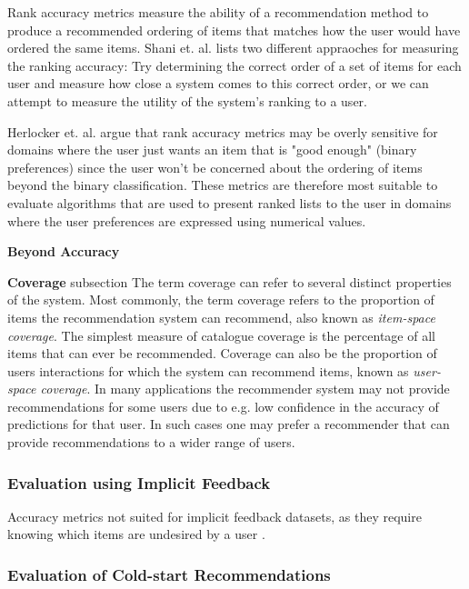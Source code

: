 Rank accuracy metrics measure the ability of a recommendation method to produce a recommended ordering of items that matches how the user would have ordered the same items. Shani et. al. \cite{Shani2011} lists two different appraoches for measuring the ranking accuracy: Try determining the correct order of a set of items for each user and measure how close a system comes to this correct order, or we can attempt to measure the utility of the system's ranking to a user.

Herlocker et. al. \cite{Herlocker2004} argue that rank accuracy metrics may be overly sensitive for domains where the user just wants an item that is "good enough" (binary preferences) since the user won't be concerned about the ordering of items beyond the binary classification. These metrics are therefore most suitable to evaluate algorithms that are used to present ranked lists to the user in domains where the user preferences are expressed using numerical values.

\textbf{Beyond Accuracy}

\textbf{Coverage}
subsection
The term coverage can refer to several distinct properties of the system. Most commonly, the term coverage refers to the proportion of items the recommendation system can recommend, also known as \emph{item-space coverage}. The simplest measure of catalogue coverage is the percentage of all items that can ever be recommended. Coverage can also be the proportion of users interactions for which the system can recommend items, known as \emph{user-space coverage}. In many applications the recommender system may not provide recommendations for some users due to e.g. low confidence in the accuracy of predictions for that user. In such cases one may prefer a recommender that can provide recommendations to a wider range of users.


\subsubsection{Evaluation using Implicit Feedback}

Accuracy metrics not suited for implicit feedback datasets, as they require knowing which items are undesired by a user \cite{Hu2008}.

\subsubsection{Evaluation of Cold-start Recommendations}


